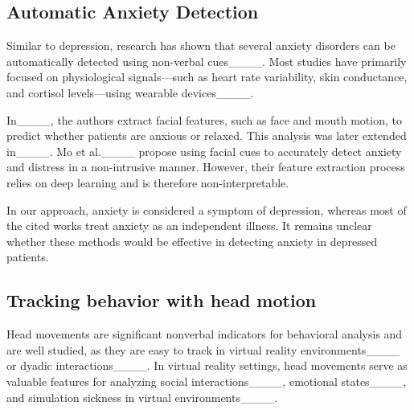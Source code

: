 \subsection{Automatic Anxiety Detection}

Similar to depression, research has shown that several anxiety disorders can be automatically detected using non-verbal cues____.
Most studies have primarily focused on physiological signals—such as heart rate variability, skin conductance, and cortisol levels—using wearable devices____.

In____, the authors extract facial features, such as face and mouth motion, to predict whether patients are anxious or relaxed. This analysis was later extended in____. Mo et al.____ propose using facial cues to accurately detect anxiety and distress in a non-intrusive manner. However, their feature extraction process relies on deep learning and is therefore non-interpretable.

In our approach, anxiety is considered a symptom of depression, whereas most of the cited works treat anxiety as an independent illness. It remains unclear whether these methods would be effective in detecting anxiety in depressed patients.

\subsection{Tracking behavior with head motion}

Head movements are significant nonverbal indicators for behavioral analysis and are well studied, as they are easy to track in virtual reality environments____ or dyadic interactions____. In virtual reality settings, head movements serve as valuable features for analyzing social interactions____, emotional states____, and simulation sickness in virtual environments____. 

